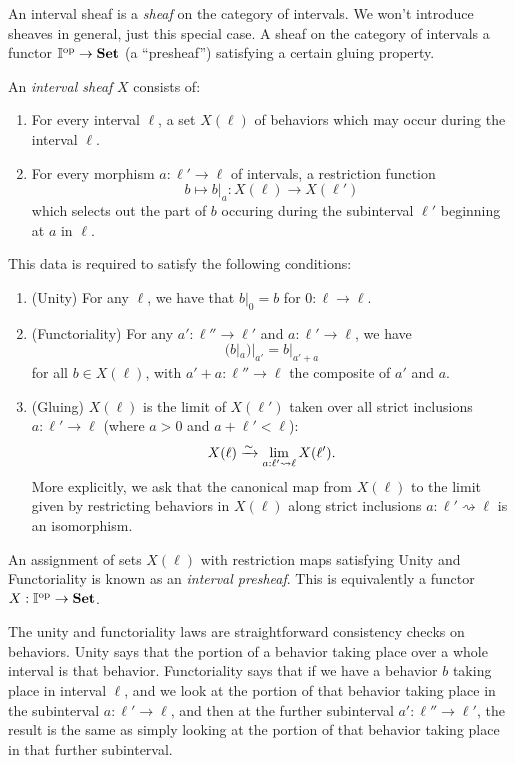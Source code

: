\documentclass[DynamicalBook]{subfiles}
\begin{document}
 An interval sheaf is a \emph{sheaf} on the category of intervals. We won't introduce sheaves in general, just this special case. A sheaf on the category of intervals a functor $\mathbb{I}^{\textnormal{op}} \to \textbf{Set}$ (a
 ``presheaf'') satisfying a certain gluing property.
 \begin{definition}
   An \emph{interval sheaf} $X$ consists of:
   \begin{enumerate}
           \item For every interval $\ell$, a set $X(\ell)$ of behaviors which may occur during the interval $\ell$.
     \item For every morphism $a : \ell' \to \ell$ of intervals, a restriction function
           $$b \mapsto b|_{a} : X(\ell) \to X(\ell')$$
           which selects out the part of $b$ occuring during the subinterval $\ell'$ beginning at $a$ in $\ell$.
    \end{enumerate}
    This data is required to satisfy the following conditions:
    \begin{enumerate}
            \item (Unity) For any $\ell$, we have that $b|_{0} = b$ for $0 : \ell \to \ell$.
      \item (Functoriality) For any $a' : \ell'' \to \ell'$ and $a : \ell' \to \ell$, we have
            $$(b|_{a})|_{a'} = b|_{a' + a}$$
            for all $b \in X(\ell)$, with $a' + a : \ell'' \to \ell$ the composite of $a'$ and $a$.
      \item (Gluing) $X(\ell)$ is the limit of $X(\ell')$ taken over all strict inclusions $a : \ell' \to \ell$ (where $a > 0$ and $a + \ell' < \ell$):
            \[
            X(\ell) \xrightarrow{\sim} \lim_{a : \ell' \rightsquigarrow \ell} X(\ell').
            \]
More explicitly, we ask that the canonical map from $X(\ell)$ to the limit given by restricting behaviors in $X(\ell)$ along strict inclusions $a : \ell' \rightsquigarrow \ell$ is an isomorphism.
    \end{enumerate}
    An assignment of sets $X(\ell)$ with restriction maps satisfying Unity and Functoriality is known as an \emph{interval presheaf}. This is equivalently a functor $X :  \mathbb{I}^{\textnormal{op}} \to \textbf{Set}$.
\end{definition}

The unity and functoriality laws are straightforward consistency checks on behaviors. Unity says that the portion of a behavior taking place over a whole interval is that behavior. Functoriality says that if we have a behavior $b$ taking place in interval $\ell$, and we look at the portion of that behavior taking place in the subinterval $a : \ell' \to \ell$, and then at the further subinterval $a' : \ell'' \to \ell'$, the result is the same as simply looking at the portion of that behavior taking place in that further subinterval.
\end{document}
